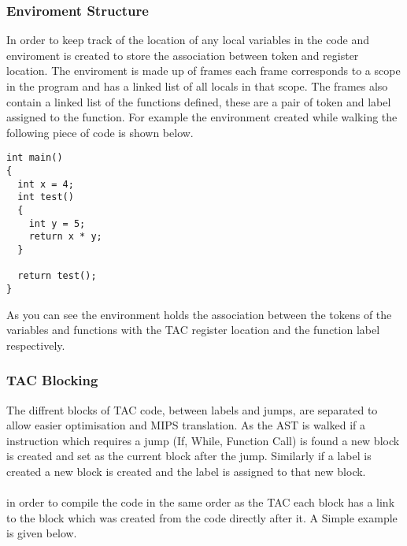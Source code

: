 \documentclass{article}
\begin{document}
\subsubsection{Enviroment Structure}

In order to keep track of the location of any local variables in the code and enviroment
is created to store the association between token and register location. The enviroment
is made up of frames each frame corresponds to a scope in the program and has
a linked list of all locals in that scope. The frames also contain a linked list of
the functions defined, these are a pair of token and label assigned to the function.
For example the environment created while walking the following piece of code is shown below.

\begin{lstlisting}
int main()
{
  int x = 4;
  int test()
  {
    int y = 5;
    return x * y;
  }

  return test();
}
\end{lstlisting}


As you can see the environment holds the association between the tokens of the variables
and functions with the TAC register location and the function label respectively.

\subsubsection{TAC Blocking}

The diffrent blocks of TAC code, between labels and jumps, are separated to allow
easier optimisation and MIPS translation. As the AST is walked if a instruction which
requires a jump (If, While, Function Call) is found a new block is created and set as the
current block after the jump. Similarly if a label is created a new block is created
and the label is assigned to that new block.\\~\\
in order to compile the code in the same order as the TAC each block has a link to
the block which was created from the code directly after it. A Simple example is
given below.\\~\\
\end{document}
